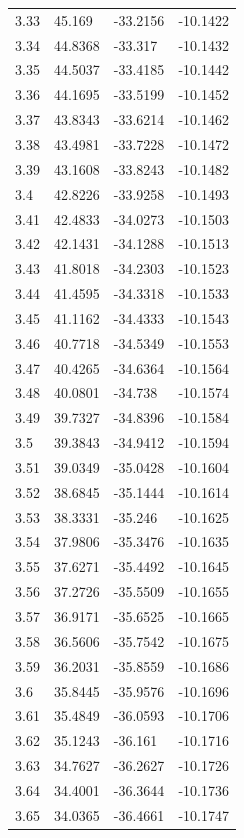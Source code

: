 \begin{tabular}{llll}
3.33 & 45.169 & -33.2156 & -10.1422 \\
3.34 & 44.8368 & -33.317 & -10.1432 \\
3.35 & 44.5037 & -33.4185 & -10.1442 \\
3.36 & 44.1695 & -33.5199 & -10.1452 \\
3.37 & 43.8343 & -33.6214 & -10.1462 \\
3.38 & 43.4981 & -33.7228 & -10.1472 \\
3.39 & 43.1608 & -33.8243 & -10.1482 \\
3.4 & 42.8226 & -33.9258 & -10.1493 \\
3.41 & 42.4833 & -34.0273 & -10.1503 \\
3.42 & 42.1431 & -34.1288 & -10.1513 \\
3.43 & 41.8018 & -34.2303 & -10.1523 \\
3.44 & 41.4595 & -34.3318 & -10.1533 \\
3.45 & 41.1162 & -34.4333 & -10.1543 \\
3.46 & 40.7718 & -34.5349 & -10.1553 \\
3.47 & 40.4265 & -34.6364 & -10.1564 \\
3.48 & 40.0801 & -34.738 & -10.1574 \\
3.49 & 39.7327 & -34.8396 & -10.1584 \\
3.5 & 39.3843 & -34.9412 & -10.1594 \\
3.51 & 39.0349 & -35.0428 & -10.1604 \\
3.52 & 38.6845 & -35.1444 & -10.1614 \\
3.53 & 38.3331 & -35.246 & -10.1625 \\
3.54 & 37.9806 & -35.3476 & -10.1635 \\
3.55 & 37.6271 & -35.4492 & -10.1645 \\
3.56 & 37.2726 & -35.5509 & -10.1655 \\
3.57 & 36.9171 & -35.6525 & -10.1665 \\
3.58 & 36.5606 & -35.7542 & -10.1675 \\
3.59 & 36.2031 & -35.8559 & -10.1686 \\
3.6 & 35.8445 & -35.9576 & -10.1696 \\
3.61 & 35.4849 & -36.0593 & -10.1706 \\
3.62 & 35.1243 & -36.161 & -10.1716 \\
3.63 & 34.7627 & -36.2627 & -10.1726 \\
3.64 & 34.4001 & -36.3644 & -10.1736 \\
3.65 & 34.0365 & -36.4661 & -10.1747 \\

\end{tabular}
